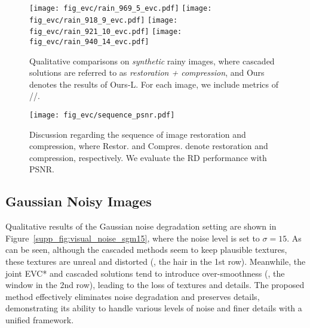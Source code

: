 \begin{figure*}[t]
\hspace*{-4pt}\texttt{[image: fig\_evc/rain\_969\_5\_evc.pdf]}\vspace{-2pt}
\hspace*{-4pt}\texttt{[image: fig\_evc/rain\_918\_9\_evc.pdf]}\vspace{-2pt}
\hspace*{-4pt}\texttt{[image: fig\_evc/rain\_921\_10\_evc.pdf]}\vspace{-2pt}
\hspace*{-4pt}\texttt{[image: fig\_evc/rain\_940\_14\_evc.pdf]}\vspace{-0.15in}
\caption{Qualitative comparisons on \textit{synthetic} rainy images, where cascaded solutions are referred to as \textit{restoration + compression}, and Ours denotes the results of Ours-L. For each image, we include metrics of //. }  \vspace{-0.1in}
\label{fig:rain}
\end{figure*}



 

 \begin{figure}[t]
\centering
\texttt{[image: fig\_evc/sequence\_psnr.pdf]}\vspace{-4pt}
\caption{Discussion regarding the sequence of image restoration and compression, where Restor. and Compres. denote restoration and compression, respectively. We evaluate the RD performance with PSNR.}  \vspace{-0.1in}
\label{fig:order}
\end{figure}

\subsection{Gaussian Noisy Images}\label{supp:noise}
Qualitative results of the Gaussian noise degradation setting are shown in Figure~\ref{supp_fig:visual_noise_sgm15}, where the noise level is set to $\sigma=15$. As can be seen, although the cascaded methods seem to keep plausible textures, these textures are unreal and distorted (\eg, the hair in the 1st row).  Meanwhile, the joint EVC* and cascaded solutions tend to introduce over-smoothness (\eg, the window in the 2nd row), leading to the loss of textures and details. The proposed method effectively eliminates noise degradation and preserves details, demonstrating its ability to handle various levels of noise and finer details with a unified framework.


